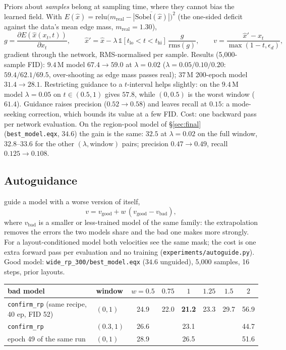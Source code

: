 \documentclass[11pt]{article}
\newcommand{\xh}{\hat{x}}
\begin{document}
Priors about \emph{samples} belong at sampling time, where they cannot bias the learned
field. With $E(\xh)=\mathrm{relu}\bigl(m_{\text{real}}-\overline{|\text{Sobel}(\xh)|}\bigr)^2$
(the one-sided deficit against the data's mean edge mass, $m_{\text{real}}=1.30$),
\begin{equation}
g=\frac{\partial E(\xh(x_t,t))}{\partial x_t},\qquad
\xh'=\xh-\lambda\,\mathbb 1[t_{\text{lo}}<t<t_{\text{hi}}]\,\frac{g}{\mathrm{rms}(g)},\qquad
v=\frac{\xh'-x_t}{\max(1-t,\epsilon_d)},
\end{equation}
gradient through the network, RMS-normalised per sample. Results (5{,}000-sample FID):
$9.4$\,M model $67.4\to59.0$ at $\lambda=0.02$ ($\lambda=0.05/0.10/0.20$:
$59.4/62.1/69.5$, over-shooting as edge mass passes real); $37$\,M 200-epoch model
$31.4\to28.1$. Restricting guidance to a $t$-interval \citep{kynkaanniemi2024interval}
helps slightly: on the $9.4$\,M model $\lambda=0.05$ on $t\in(0.5,1)$ gives $57.8$,
while $(0,0.5)$ is the worst window ($61.4$). Guidance raises precision
($0.52\to0.58$) and leaves recall at $0.15$: a mode-seeking correction, which bounds its
value at a few FID. Cost: one backward pass per network evaluation. On the
region-pool model of \S\ref{sec:final} (\texttt{best\_model.eqx}, $34.6$) the gain is
the same: $32.5$ at $\lambda=0.02$ on the full window, $32.8$--$33.6$ for the other
$(\lambda,\text{window})$ pairs; precision $0.47\to0.49$, recall $0.125\to0.108$.

\subsection{Autoguidance}\label{sec:autoguide}

\citet{karras2024autoguidance} guide a model with a worse version of itself,
\begin{equation}
v = v_{\text{good}} + w\,(v_{\text{good}} - v_{\text{bad}}),
\end{equation}
where $v_{\text{bad}}$ is a smaller or less-trained model of the same family: the
extrapolation removes the errors the two models share and the bad one makes more
strongly. For a layout-conditioned model both velocities see the same mask; the cost is
one extra forward pass per evaluation and no training
(\texttt{experiments/autoguide.py}). Good model: \texttt{wide\_rp\_300/best\_model.eqx}
($34.6$ unguided), 5{,}000 samples, 16 steps, prior layouts.

\begin{center}\small
\begin{tabular}{llcccccc}
\toprule
bad model & window & $w{=}0.5$ & $0.75$ & $1$ & $1.25$ & $1.5$ & $2$ \\
\midrule
\texttt{confirm\_rp} (same recipe, 40 ep, FID 52) & $(0,1)$ & 24.9 & 22.0 & \textbf{21.2} & 23.3 & 29.7 & 56.9 \\
\texttt{confirm\_rp} & $(0.3,1)$ & 26.6 & & 23.1 & & & 44.7 \\
epoch 49 of the same run & $(0,1)$ & 28.9 & & 26.5 & & & 51.6 \\
\bottomrule
\end{tabular}
\end{center}
\end{document}
